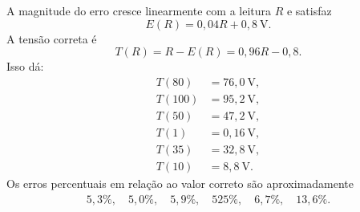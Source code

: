 A magnitude do erro cresce linearmente com a leitura $R$ e satisfaz
\[
E(R)=0{,}04R+0{,}8\ \mathrm{V}.
\]
A tensão correta é
\[
T(R)=R-E(R)=0{,}96R-0{,}8.
\]
Isso dá:
\begin{align*}
T(80)&=76{,}0\ \mathrm{V},\\
T(100)&=95{,}2\ \mathrm{V},\\
T(50)&=47{,}2\ \mathrm{V},\\
T(1)&=0{,}16\ \mathrm{V},\\
T(35)&=32{,}8\ \mathrm{V},\\
T(10)&=8{,}8\ \mathrm{V}.
\end{align*}
Os erros percentuais em relação ao valor correto são aproximadamente
\begin{align*}
5{,}3\%,\quad 5{,}0\%,\quad 5{,}9\%,\quad 525\%,\quad 6{,}7\%,\quad 13{,}6\%.
\end{align*}